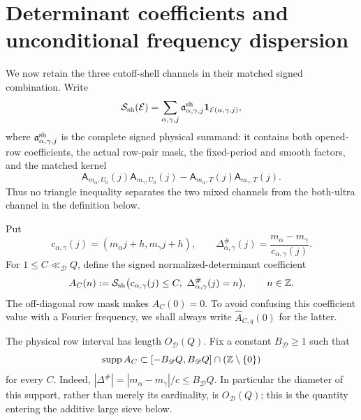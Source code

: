 \section{Determinant coefficients and unconditional frequency dispersion}
\label{sec:tpc32-determinant-dispersion}

We now retain the three cutoff-shell channels in their matched signed
combination.  Write
\begin{equation}
 \mathcal S_{\rm sh}(\mathcal E)
 =\sum_{\alpha,\gamma,j}
   \mathfrak a^{\rm sh}_{\alpha,\gamma,j}
   \mathbf 1_{\mathcal E(\alpha,\gamma,j)},
 \label{eq:tpc32-matched-physical-sum}
\end{equation}
where $\mathfrak a^{\rm sh}_{\alpha,\gamma,j}$ is the complete signed
physical summand: it contains both opened-row coefficients, the actual
row-pair mask, the fixed-period and smooth factors, and the matched
kernel
\[
 \mathsf A_{m_\alpha,U_0}(j)\mathsf A_{m_\gamma,U_0}(j)
 -\mathsf A_{m_\alpha,T}(j)\mathsf A_{m_\gamma,T}(j).
\]
Thus no triangle inequality separates the two mixed channels from the
both-ultra channel in the definition below.

Put
\begin{equation}
 c_{\alpha,\gamma}(j)
 =(m_\alpha j+h,m_\gamma j+h),
 \qquad
 \Delta^\#_{\alpha,\gamma}(j)
 =\frac{m_\alpha-m_\gamma}{c_{\alpha,\gamma}(j)}.
 \label{eq:tpc32-dispersion-content-determinant}
\end{equation}
For $1\le C\ll_{\mathscr D}Q$, define the signed
normalized-determinant coefficient
\begin{equation}
 A_C(n)
 :=\mathcal S_{\rm sh}
 \bigl(c_{\alpha,\gamma}(j)\le C,
       \ \Delta^\#_{\alpha,\gamma}(j)=n\bigr),
 \qquad n\in\mathbb Z.
 \label{eq:tpc32-determinant-coefficient}
\end{equation}
The off-diagonal row mask makes $A_C(0)=0$.  To avoid confusing this
coefficient value with a Fourier frequency, we shall always write
$\widehat A_{C,q}(0)$ for the latter.

The physical row interval has length $O_{\mathscr D}(Q)$.  Fix a
constant $B_{\mathscr D}\ge1$ such that
\begin{equation}
 \operatorname{supp}A_C
 \subset
 [-B_{\mathscr D}Q,B_{\mathscr D}Q]\cap
 (\mathbb Z\setminus\{0\})
 \label{eq:tpc32-determinant-support-interval}
\end{equation}
for every $C$.  Indeed,
$|\Delta^\#|=|m_\alpha-m_\gamma|/c\le
B_{\mathscr D}Q$.  In particular the diameter of this support, rather
than merely its cardinality, is $O_{\mathscr D}(Q)$; this is the
quantity entering the additive large sieve below.

